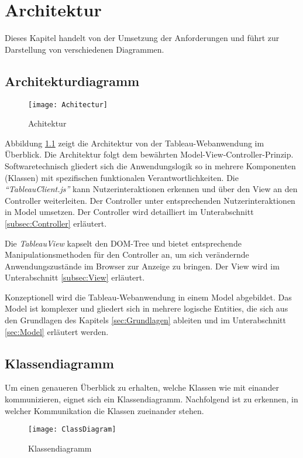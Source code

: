 \chapter{Architektur}\label{sec:Architektur}
Dieses Kapitel handelt von der Umsetzung der Anforderungen 
und führt zur Darstellung von verschiedenen Diagrammen.
\section{Architekturdiagramm}
\begin{figure}[ !h] \centering
\texttt{[image: Achitectur]}
\caption[Achitektur]{Achitektur}\label{fig:Achitectur}
\end{figure}
Abbildung \ref{fig:Achitectur} zeigt die Architektur von der Tableau-Webanwendung im Überblick. Die Architektur folgt dem bewährten Model-View-Controller-Prinzip. Softwaretechnisch gliedert sich die
Anwendungslogik so in mehrere Komponenten (Klassen) mit spezifischen funktionalen Verantwortlichkeiten.
Die \textit{``TableauClient.js''}
 kann Nutzerinteraktionen erkennen und über den View an den Controller weiterleiten. Der Controller unter entsprechenden Nutzerinteraktionen in 
Model
umsetzen. Der Controller wird detailliert im Unterabschnitt \ref{subsec:Controller} erläutert.

Die \textit{TableauView} kapselt den DOM-Tree und bietet entsprechende Manipulationsmethoden für den Controller an, um sich verändernde Anwendungszustände im Browser zur Anzeige zu bringen. Der View wird im Unterabschnitt \ref{subsec:View} erläutert.

Konzeptionell wird die Tableau-Webanwendung in einem Model abgebildet. Das Model ist komplexer und gliedert sich in mehrere logische Entities, die sich aus den Grundlagen des Kapitels \ref{sec:Grundlagen} ableiten und im Unterabschnitt \ref{sec:Model} erläutert werden.

\section{Klassendiagramm}
Um einen genaueren Überblick zu erhalten, welche Klassen wie mit einander kommunizieren, eignet sich ein Klassendiagramm. Nachfolgend ist zu erkennen, in welcher Kommunikation die Klassen zueinander stehen.
\begin{figure}[ !h] \centering
\texttt{[image: ClassDiagram]}
\caption[Klassendiagramm]{Klassendiagramm}\label{fig:Klassendiagramm}
\end{figure}

